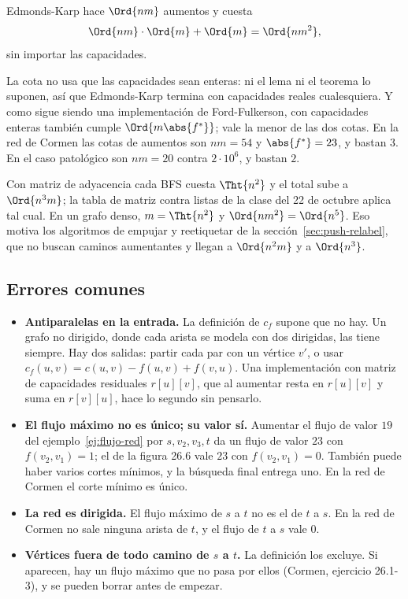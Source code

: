\documentclass[11pt,letterpaper]{article}
\begin{document}
\begin{resultado}
  Edmonds-Karp hace $\Ord{nm}$ aumentos y cuesta
  \[
    \Ord{nm} \cdot \Ord{m} + \Ord{m} = \Ord{n m^2} ,
  \]
  sin importar las capacidades.
\end{resultado}

La cota no usa que las capacidades sean enteras: ni el lema ni el
teorema lo suponen, así que Edmonds-Karp termina con capacidades
reales cualesquiera. Y como sigue siendo una implementación de
Ford-Fulkerson, con capacidades enteras también cumple
$\Ord{m \abs{f^*}}$; vale la menor de las dos cotas. En la red de
Cormen las cotas de aumentos son $nm = 54$ y $\abs{f^*} = 23$, y bastan
$3$. En el caso patológico son $nm = 20$ contra $2 \cdot 10^6$, y
bastan $2$.

Con matriz de adyacencia cada BFS cuesta $\Tht{n^2}$ y el total sube a
$\Ord{n^3 m}$; la tabla de matriz contra listas de la clase del 22 de
octubre aplica tal cual. En un grafo denso, $m = \Tht{n^2}$ y
$\Ord{n m^2} = \Ord{n^5}$. Eso motiva los algoritmos de empujar y
reetiquetar de la sección~\ref{sec:push-relabel}, que no buscan
caminos aumentantes y llegan a $\Ord{n^2 m}$ y a $\Ord{n^3}$.


\subsection*{Errores comunes}

\begin{ojo}
  \begin{itemize}
    \item \textbf{Antiparalelas en la entrada.} La definición de $c_f$
          supone que no hay. Un grafo no dirigido, donde cada arista
          se modela con dos dirigidas, las tiene siempre. Hay dos
          salidas: partir cada par con un vértice $v'$, o usar
          $c_f(u, v) = c(u, v) - f(u, v) + f(v, u)$. Una
          implementación con matriz de capacidades residuales
          $r[u][v]$, que al aumentar resta en $r[u][v]$ y suma en
          $r[v][u]$, hace lo segundo sin pensarlo.
    \item \textbf{El flujo máximo no es único; su valor sí.} Aumentar
          el flujo de valor $19$ del ejemplo~\ref{ej:flujo-red} por
          $s, v_2, v_3, t$ da un flujo de valor $23$ con
          $f(v_2, v_1) = 1$; el de la figura 26.6 vale $23$ con
          $f(v_2, v_1) = 0$. También puede haber varios cortes
          mínimos, y la búsqueda final entrega uno. En la red de
          Cormen el corte mínimo es único.
    \item \textbf{La red es dirigida.} El flujo máximo de $s$ a $t$
          no es el de $t$ a $s$. En la red de Cormen no sale ninguna
          arista de $t$, y el flujo de $t$ a $s$ vale $0$.
    \item \textbf{Vértices fuera de todo camino de $s$ a $t$.} La
          definición los excluye. Si aparecen, hay un flujo máximo que
          no pasa por ellos (Cormen, ejercicio 26.1-3), y se pueden
          borrar antes de empezar.
  \end{itemize}
\end{ojo}
\end{document}
